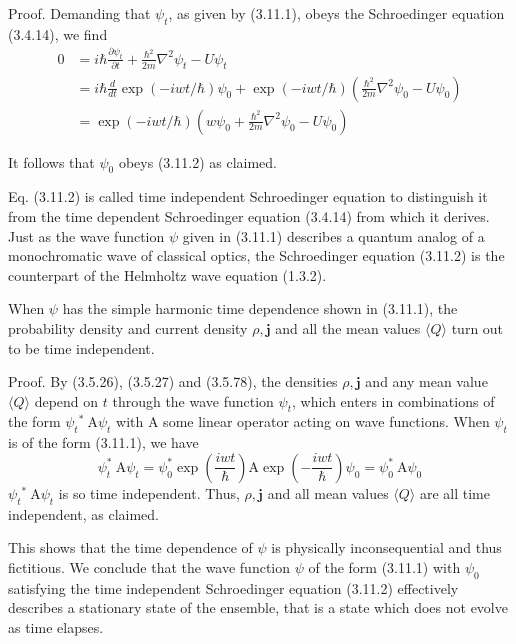 \documentclass{article}
\begin{document}
Proof. Demanding that $\psi_{t}$, as given by (3.11.1), obeys the Schroedinger equation (3.4.14), we find
$$
\begin{align*}
0 & =i \hbar \frac{\partial \psi_{t}}{\partial t}+\frac{\hbar^{2}}{2 m} \nabla^{2} \psi_{t}-U \psi_{t}  \tag{3.11.3}\\
& =i \hbar \frac{d}{d t} \exp (-i w t / \hbar) \psi_{0}+\exp (-i w t / \hbar)\left(\frac{\hbar^{2}}{2 m} \nabla^{2} \psi_{0}-U \psi_{0}\right) \\
& =\exp (-i w t / \hbar)\left(w \psi_{0}+\frac{\hbar^{2}}{2 m} \nabla^{2} \psi_{0}-U \psi_{0}\right)
\end{align*}
$$

It follows that $\psi_{0}$ obeys (3.11.2) as claimed.

Eq. (3.11.2) is called time independent Schroedinger equation to distinguish it from the time dependent Schroedinger equation (3.4.14) from which it derives. Just as the wave function $\psi$ given in (3.11.1) describes a quantum analog of a monochromatic wave of classical optics, the Schroedinger equation (3.11.2) is the counterpart of the Helmholtz wave equation (1.3.2).

When $\psi$ has the simple harmonic time dependence shown in (3.11.1), the probability density and current density $\rho, \boldsymbol{j}$ and all the mean values $\langle Q\rangle$ turn out to be time independent.

Proof. By (3.5.26), (3.5.27) and (3.5.78), the densities $\rho, \boldsymbol{j}$ and any mean value $\langle Q\rangle$ depend on $t$ through the wave function $\psi_{t}$, which enters in combinations of the form $\psi_{t}{ }^{*} \mathrm{~A} \psi_{t}$ with A some linear operator acting on wave functions. When $\psi_{t}$ is of the form (3.11.1), we have
$$
\begin{equation*}
\psi_{t}^{*} \mathrm{~A} \psi_{t}=\psi_{0}^{*} \exp \left(\frac{i w t}{\hbar}\right) \mathrm{A} \exp \left(-\frac{i w t}{\hbar}\right) \psi_{0}=\psi_{0}^{*} \mathrm{~A} \psi_{0} \tag{3.11.4}
\end{equation*}
$$
$\psi_{t}{ }^{*} \mathrm{~A} \psi_{t}$ is so time independent. Thus, $\rho, \boldsymbol{j}$ and all mean values $\langle Q\rangle$ are all time independent, as claimed.

This shows that the time dependence of $\psi$ is physically inconsequential and thus fictitious. We conclude that
the wave function $\psi$ of the form (3.11.1) with $\psi_{0}$ satisfying the time independent Schroedinger equation (3.11.2) effectively describes a stationary state of the ensemble, that is a state which does not evolve as time elapses.
\end{document}
